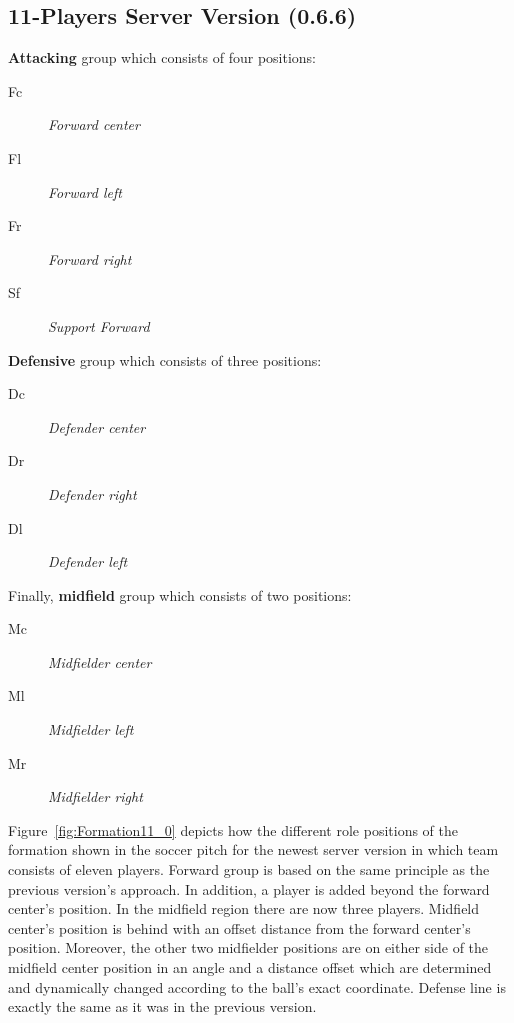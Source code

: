 \subsection{11-Players Server Version (0.6.6)}
\textbf{Attacking} group which consists of four positions:
\begin{description}
\item[Fc] \textit{Forward center}
\item[Fl] \textit{Forward left}
\item[Fr] \textit{Forward right}
\item[Sf] \textit{Support Forward}
\end{description}
\textbf{Defensive} group which consists of three positions:
\begin{description}
\item[Dc] \textit{Defender center}
\item[Dr] \textit{Defender right }
\item[Dl] \textit{Defender left}
\end{description}
Finally, \textbf{midfield} group which consists of two positions:
\begin{description}
\item[Mc] \textit{Midfielder center}
\item[Ml] \textit{Midfielder left}
\item[Mr] \textit{Midfielder right}
\end{description}



Figure~\ref{fig:Formation11_0} depicts how the different role positions of the formation shown in the soccer pitch for the newest server version in which team consists of eleven players. Forward group is based on the same principle as the previous version's approach. In addition, a player is added beyond the forward center's position. In the midfield region there are now three players. Midfield center's position is behind with an offset distance from the forward center's position. Moreover, the other two midfielder positions are on either side of the midfield center position in an angle and a distance offset which are determined and dynamically changed according to the ball's exact coordinate. Defense line is exactly the same as it was in the previous version.


